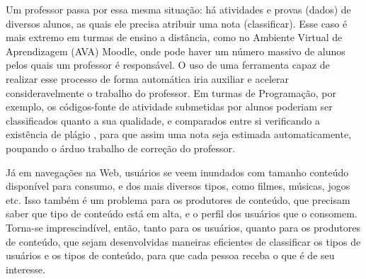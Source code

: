 Um professor passa por essa mesma situação: há atividades e provas (dados) de diversos alunos, as quais ele precisa atribuir uma nota (classificar). Esse caso é mais extremo em turmas de ensino a distância, como no Ambiente Virtual de Aprendizagem (AVA) Moodle, onde pode haver um número massivo de alunos pelos quais um professor é responsável. O uso de uma ferramenta capaz de realizar esse processo de forma automática iria auxiliar e acelerar consideravelmente o trabalho do professor. Em turmas de Programação, por exemplo, os códigos-fonte de atividade submetidas por alunos poderiam ser classificados quanto a sua qualidade, e comparados entre si verificando a existência de plágio \cite{Campana:2016}, para que assim uma nota seja estimada automaticamente, poupando o árduo trabalho de correção do professor.

Já em navegações na Web, usuários se veem inundados com tamanho conteúdo disponível para consumo, e dos mais diversos tipos, como filmes, músicas, jogos etc. Isso também é um problema para os produtores de conteúdo, que precisam saber que tipo de conteúdo está em alta, e o perfil dos usuários que o consomem. Torna-se imprescindível, então, tanto para os usuários, quanto para os produtores de conteúdo, que sejam desenvolvidas maneiras eficientes de classificar os tipos de usuários e os tipos de conteúdo, para que cada pessoa receba o que é de seu interesse.